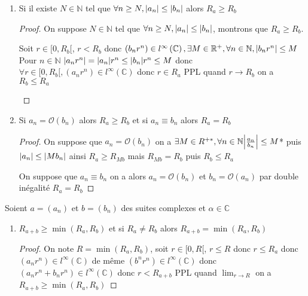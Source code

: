 \documentclass[11pt,hidelinks]{book}
\theoremstyle{mytheoremstyle}
\theoremstyle{mytheoremstyle}
\theoremstyle{mytheoremstyle}
\theoremstyle{mytheoremstyle}
\theoremstyle{mytheoremstyle}
\theoremstyle{mytheoremstyle}
\theoremstyle{mytheoremstyle}
\theoremstyle{mytheoremstyle}
\theoremstyle{myproblemstyle}
\def\mbb#1{\mathbb{#1}}
\def\mfc#1{\mathcal{#1}}
\def\bN{\mbb{N}}
\def\bC{\mbb{C}}
\def\bR{\mbb{R}}
\def\born{l^{\infty}\left( \bC \right)}
\def\bO{\mfc{O}}
\begin{document}
\begin{adjustwidth}{-2em}{-1em}
\begin{prop}
        \begin{enumerate}
        \item Si il existe $N \in \bN$ tel que $\forall n \geq N, \abs{a_n} \leq \abs{b_n}$ alors $R_a \geq R_b$
        \begin{proof}
            On suppose $N \in \bN$ tel que $\forall n \geq N, \abs{a_n} \leq \abs{b_n}$, montrons que 
            $R_a \geq R_b$.
            \begin{ef}
                Soit $r \in [0, R_b[$, $r < R_b$ donc $(b_n r^n) \in \born, 
                \exists M \in \bR^{+}, \forall n \in \bN, \abs{b_nr^n} \leq M$
                Pour $n \in \bN$ $\abs{a_nr^n} = \abs{a_n} r^n \leq \abs{b_n} r^n \leq M$
                donc $\forall r \in [0,R_b[, (a_nr^n) \in \born$ donc $r \in R_a$
                PPL quand $r \to R_b$ on a $R_b \leq R_a$
            \end{ef}
        \end{proof}

        \item Si $a_n = \bO (b_n)$ alors $R_a \geq R_b$ et si $a_n \equiv b_n$ alors $R_a = R_b$
        \begin{proof}
            On suppose que $a_n = \bO(b_n)$ on a $\exists M \in R^{+*}, \forall n \in \bN \abs{\frac{a_n}{b_n}} \leq M$*
            puis $\abs{a_n} \leq \abs{Mb_n}$ ainsi $R_a \geq R_{Mb}$ mais 
            $R_{Mb} = R_b$ puis $R_b \leq R_a$ 

            On suppose que $a_n \equiv b_n$ on a alors $a_n = \bO(b_n)$ et $b_n = \bO(a_n)$ 
            par double inégalité $R_a = R_b$
        \end{proof}
    \end{enumerate}
    \end{prop}
    \begin{prop}
        Soient $a = (a_n)$ et $b = (b_n)$ des suites complexes et $\alpha \in \bC$
        \begin{enumerate}
        \item $R_{a+b} \geq \min(R_a,R_b)$ et si $R_a \not= R_b$ alors $R_{a+b} = \min(R_a,R_b)$
        \begin{proof}
            On note $R = \min(R_a,R_b)$, soit $r \in [0,R[$, 
            $r \leq R$ donc $r \leq R_a$ donc $(a_nr^n) \in \born$ 
            de même $(b^nr^n) \in \born$ donc $(a_nr^n + b_nr^n) \in \born$ donc $r < R_{a+b}$ 
            PPL quand $\lim_{r \to R}$ on a $R_{a+b} \geq \min(R_a,R_b)$ 
        \end{proof}  


\end{enumerate}
\end{prop}
\end{adjustwidth}
\end{document}
